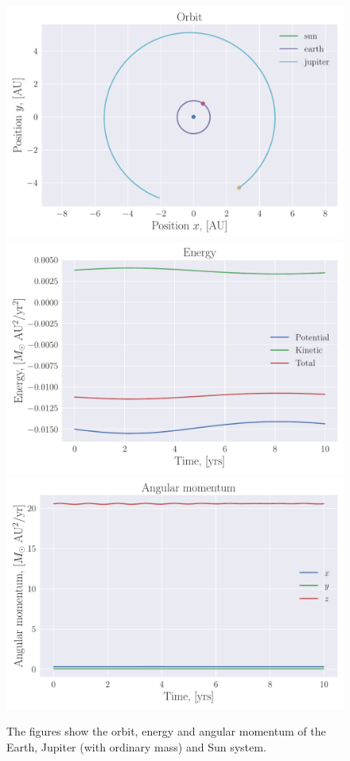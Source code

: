 \documentclass[reprint, english,notitlepage,nofootinbib]{revtex4-1}  %
\begin{document}
\begin{figure}[h]
	\centering
	\includegraphics[width=\linewidth]{../output/three_body-verlet-5-6-2.pdf}
	\includegraphics[width=\linewidth]{../output/three_body-verlet-5-6-2_energy.pdf}
	\includegraphics[width=\linewidth]{../output/three_body-verlet-5-6-2_ang_mom.pdf}
	\caption{The figures show the orbit, energy and angular momentum of the Earth, Jupiter (with ordinary mass) and Sun system.}
	\label{fig:three_body}
\end{figure}
\end{document}

